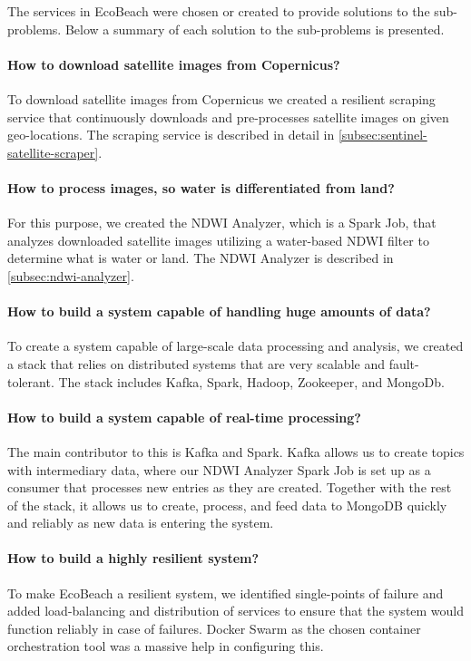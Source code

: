 \noindent
The services in EcoBeach were chosen or created to provide solutions to the sub-problems. Below a summary of each solution to the sub-problems is presented.

\paragraph{How to download satellite images from Copernicus?} To download satellite images from Copernicus we created a resilient scraping service that continuously downloads and pre-processes satellite images on given geo-locations. The scraping service is described in detail in \autoref{subsec:sentinel-satellite-scraper}.

\paragraph{How to process images, so water is differentiated from land?} For this purpose, we created the NDWI Analyzer, which is a Spark Job, that analyzes downloaded satellite images utilizing a water-based NDWI  filter to determine what is water or land. The NDWI Analyzer is described in \autoref{subsec:ndwi-analyzer}.

\paragraph{How to build a system capable of handling huge amounts of data?} To create a system capable of large-scale data processing and analysis, we created a stack that relies on distributed systems that are very scalable and fault-tolerant. The stack includes Kafka, Spark, Hadoop, Zookeeper, and MongoDb.

\paragraph{How to build a system capable of real-time processing?} The main contributor to this is Kafka and Spark. Kafka allows us to create topics with intermediary data, where our NDWI Analyzer Spark Job is set up as a consumer that processes new entries as they are created. Together with the rest of the stack, it allows us to create, process, and feed data to MongoDB quickly and reliably as new data is entering the system.

\paragraph{How to build a highly resilient system?} To make EcoBeach a resilient system, we identified single-points of failure and added load-balancing and distribution of services to ensure that the system would function reliably in case of failures. Docker Swarm as the chosen container orchestration tool was a massive help in configuring this.

